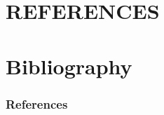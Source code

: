 \documentclass[c]{beamer}
\begin{document}
	
	\section{REFERENCES}
	\section*{Bibliography}
	
	
	\begin{frame}[<1->][allowframebreaks]
		\frametitle{References}		
		\nocite{*}
		
		{\small }
	\end{frame}
	
	
\end{document}

